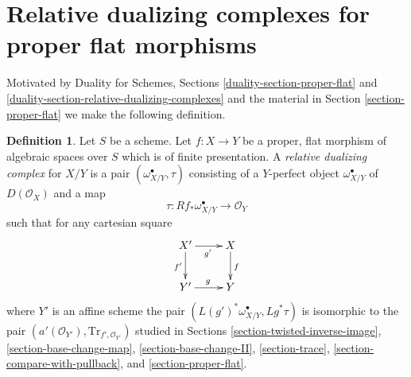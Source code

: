 \documentclass{stacks-project}
\theoremstyle{plain}
\theoremstyle{definition}
\newtheorem{definition}[subsection]{Definition}
\theoremstyle{remark}
\numberwithin{equation}{subsection}
\begin{document}
\section{Relative dualizing complexes for proper flat morphisms}
\label{section-relative-dualizing-proper-flat}

\noindent
Motivated by Duality for Schemes, Sections
\ref{duality-section-proper-flat} and
\ref{duality-section-relative-dualizing-complexes}
and the material in
Section \ref{section-proper-flat}
we make the following definition.

\begin{definition}
\label{definition-relative-dualizing-proper-flat}
Let $S$ be a scheme. Let $f : X \to Y$ be a proper, flat morphism
of algebraic spaces over $S$ which is of finite presentation.
A {\it relative dualizing complex} for $X/Y$ is a pair
$(\omega_{X/Y}^\bullet, \tau)$ consisting of a
$Y$-perfect object $\omega_{X/Y}^\bullet$ of $D(\mathcal{O}_X)$
and a map
$$
\tau : Rf_*\omega_{X/Y}^\bullet \longrightarrow \mathcal{O}_Y
$$
such that for any cartesian square
$$
\xymatrix{
X' \ar[r]_{g'} \ar[d]_{f'} & X \ar[d]^f \\
Y' \ar[r]^g & Y
}
$$
where $Y'$ is an affine scheme the pair
$(L(g')^*\omega_{X/Y}^\bullet, Lg^*\tau)$
is isomorphic to the pair
$(a'(\mathcal{O}_{Y'}), \text{Tr}_{f', \mathcal{O}_{Y'}})$
studied in Sections
\ref{section-twisted-inverse-image},
\ref{section-base-change-map},
\ref{section-base-change-II},
\ref{section-trace},
\ref{section-compare-with-pullback}, and
\ref{section-proper-flat}.
\end{definition}
\end{document}
